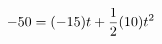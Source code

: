\documentclass[preview]{standalone}
\begin{document}
\begin{align*}
\special{dvisvgm:raw <g id='unique000'>}-50 = (-15)t + \frac{1}{2}(10)t^2\special{dvisvgm:raw </g>}
\end{align*}
\end{document}
